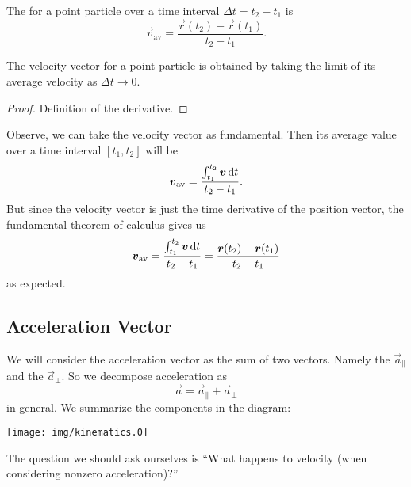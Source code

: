 \begin{defn}
The  for a point particle over a time interval
$\Delta t = t_{2}-t_{1}$ is
\begin{equation}
    \vec{v}_{\text{av}} = \frac{\vec{r}(t_{2})-\vec{r}(t_{1})}{t_{2}-t_{1}}.
\end{equation}
\end{defn}

\begin{thm}
The velocity vector for a point particle is obtained by taking the limit
of its average velocity as $\Delta t\to0$.
\end{thm}
\begin{proof}
Definition of the derivative.
\end{proof}

\begin{rmk}
Observe, we can take the velocity vector as fundamental. Then its
average value over a time interval $[t_{1},t_{2}]$ will be
\begin{equation}
\vec{v}_{\text{av}} = \frac{\int^{t_{2}}_{t_{1}}\vec{v}\,\D t}{t_{2}-t_{1}}.
\end{equation}
But since the velocity vector is just the time derivative of the
position vector,
the fundamental theorem of calculus gives us
\begin{equation}
\vec{v}_{\text{av}} = \frac{\int^{t_{2}}_{t_{1}}\vec{v}\,\D t}{t_{2}-t_{1}}
 = \frac{\vec{r}(t_{2})-\vec{r}(t_{1})}{t_{2}-t_{1}}
\end{equation}
as expected.
\end{rmk}



\subsection{Acceleration Vector}

\M We will consider the acceleration vector as the sum of two
vectors. Namely the  $\vec{a}_{\parallel}$
and the  $\vec{a}_{\perp}$. So we
decompose acceleration as
\begin{equation}
\vec{a} = \vec{a}_{\parallel}+\vec{a}_{\perp}
\end{equation}
in general. We summarize the components in the diagram:
\begin{center}
\texttt{[image: img/kinematics.0]}
\end{center}
\noindent%
The question we should ask ourselves is ``What happens to velocity (when
considering nonzero acceleration)?''

